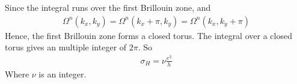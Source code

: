 \documentclass[a4paper]{article}
\begin{document}
Since the integral runs over the first Brillouin zone, and
\begin{align*}
	\Omega^n(k_x, k_y) = \Omega^n(k_x+\pi, k_y) = \Omega^n(k_x, k_y + \pi)
\end{align*}
Hence, the first Brillouin zone forms a closed torus. The integral over a closed torus gives an multiple integer of $2\pi$. So
\begin{align*}
	\sigma_H = \nu \frac{e^2}{h}
\end{align*}
Where $\nu$ is an integer.
\end{document}
